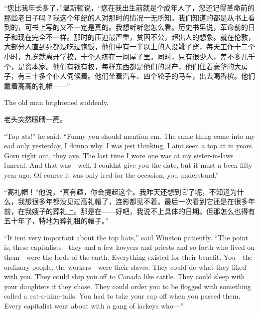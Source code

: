 \begin{paracol}{2}
\switchcolumn

``您比我年长多了，''温斯顿说，``您在我出生前就是个成年人了，您还记得革命前的那些老日子吗？我这个年纪的人对那时的情况一无所知。我们知道的都是从书上看到的，可书上写的又不一定是真的。我想听听您怎么看。历史书里说，革命前的日子和现在完全不一样。那时的压迫最严重，贫困不公，超出人的想象。就在伦敦，大部分人直到死都没吃过饱饭，他们中有一半以上的人没靴子穿，每天工作十二个小时，九岁就离开学校，十个人挤在一间屋子里。同时，只有很少人，差不多几千个，是资本家。他们有钱有权，每样东西都是他们的财产，他们住着豪华的大房子，有三十多个仆人伺候着。他们坐着汽车、四个轮子的马车，出去喝香槟。他们戴着高高的礼帽——''

\switchcolumn*

The old man brightened suddenly.

\switchcolumn

老头突然眼睛一亮。

\switchcolumn*

``Top \textquotesingle ats!'' he said. ``Funny you should mention
\textquotesingle em. The same thing come into my \textquotesingle ead
only yesterday, I donno why. I was jest thinking, I
ain\textquotesingle t seen a top \textquotesingle at in years. Gorn
right out, they \textquotesingle ave. The last time I wore one was at my
sister-in-law\textquotesingle s funeral. And that was---well, I
couldn\textquotesingle t give you the date, but it must
\textquotesingle a been fifty year ago. Of course it was only
\textquotesingle ired for the occasion, you understand.''

\switchcolumn

``高礼帽！''他说，``真有趣，你会提起这个。我昨天还想到它了呢，不知道为什么，我想很多年都没见过高礼帽了，连影都见不着。最后一次看到它还是在很多年前，在我嫂子的葬礼上。那是在——好吧，我说不上具体的日期。但那怎么也得有五十年了，特地为葬礼租的帽子。''

\switchcolumn*

``It isn\textquotesingle t very important about the top hats,'' said
Winston patiently. ``The point is, these capitalists---they and a few
lawyers and priests and so forth who lived on them---were the lords of
the earth. Everything existed for their benefit. You---the ordinary
people, the workers---were their slaves. They could do what they liked
with you. They could ship you off to Canada like cattle. They could
sleep with your daughters if they chose. They could order you to be
flogged with something called a cat-o\textquotesingle-nine-tails. You
had to take your cap off when you passed them. Every capitalist went
about with a gang of lackeys who---''


\end{paracol}
